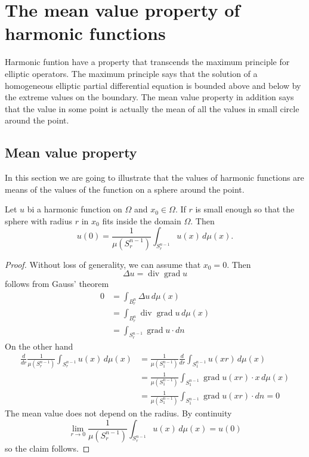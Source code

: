 %
%
%
\section{The mean value property of harmonic functions}
Harmonic funtion have a property that transcends the maximum principle
for elliptic operators.
The maximum principle says that the solution of a homogeneous elliptic
partial differential equation is bounded above and below by the
extreme values on the boundary.
The mean value property in addition says that the value in some
point is actually the mean of all the values in small circle
around the point.

\subsection{Mean value property}
In this section we are going to illustrate that the values of harmonic
functions are means of the values of the function on a sphere around 
the point.

\begin{satz}
Let $u$ bi a harmonic function on $\Omega$ and $x_0\in\Omega$.
If $r$ is small enough so that the sphere with radius $r$ in $x_0$
fits inside the domain $\Omega$.
Then
\[
u(0)=\frac1{\mu(S^{n-1}_r)}\int_{S^{n-1}_r}u(x)\,d\mu(x).
\]
\end{satz}
\begin{proof}
Without loss of generality, we can assume that $x_0=0$.
Then
\[
\Delta u=\operatorname{div}\operatorname{grad}u
\]
follows from Gauss' theorem
\begin{align*}
0&=\int_{B_r^n}\Delta u\,d\mu(x)
\\
&=\int_{B_r^n}\operatorname{div}\operatorname{grad}u\,d\mu(x)
\\
&=\int_{S_r^{n-1}} \operatorname{grad}u\cdot dn
\end{align*}
On the other hand
\begin{align*}
\frac{d}{dr}\frac{1}{\mu(S_r^{n-1})}\int_{S_r^{n-1}} u(x)\,d\mu(x)
&=
\frac1{\mu(S_1^{n-1})}\frac{d}{dr}\int_{S_1^{n-1}}u(xr)\,d\mu(x)
\\
&=
\frac1{\mu(S_1^{n-1})}\int_{S_1^{n-1}}\operatorname{grad}u(xr)\cdot x
\,d\mu(x)
\\
&=
\frac1{\mu(S_1^{n-1})}\int_{S_1^{n-1}}\operatorname{grad}u(xr)\cdot dn=0
\end{align*}
The mean value does not depend on the radius.
By continuity
\[
\lim_{r\to 0}\frac1{\mu(S_r^{n-1})}\int_{S_r^{n-1}}u(x)\,d\mu(x)=u(0)
\]
so the claim follows.
\end{proof}

